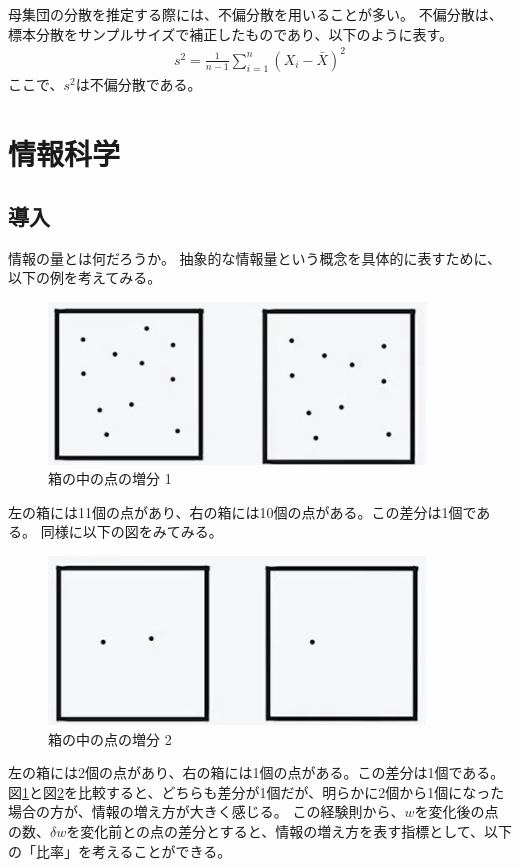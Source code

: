 \documentclass{ltjsarticle}
\begin{document}
母集団の分散を推定する際には、不偏分散を用いることが多い。
不偏分散は、標本分散をサンプルサイズで補正したものであり、以下のように表す。
\begin{align}
s^2 = \frac{1}{n-1} \sum_{i=1}^{n} (X_i - \bar{X})^2
\end{align}
ここで、$s^2$は不偏分散である。


\newpage

\section{情報科学}
\subsection{導入}
情報の量とは何だろうか。
抽象的な情報量という概念を具体的に表すために、以下の例を考えてみる。
\begin{figure}[htbp]
  \centering
  \includegraphics[width=10cm]{box_10.png}
  \caption{箱の中の点の増分 1}
  \label{fig:box_10}
\end{figure}
左の箱には11個の点があり、右の箱には10個の点がある。この差分は1個である。
同様に以下の図をみてみる。
\begin{figure}[htbp]
  \centering
  \includegraphics[width=10cm]{box_1.png}
  \caption{箱の中の点の増分 2}
  \label{fig:box_1}
\end{figure}
左の箱には2個の点があり、右の箱には1個の点がある。この差分は1個である。
図\ref{fig:box_10}と図\ref{fig:box_1}を比較すると、どちらも差分が1個だが、明らかに2個から1個になった場合の方が、情報の増え方が大きく感じる。
この経験則から、$w$を変化後の点の数、$\delta w$を変化前との点の差分とすると、情報の増え方を表す指標として、以下の「比率」を考えることができる。
\end{document}
